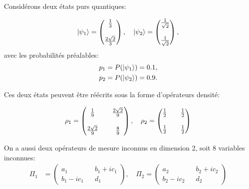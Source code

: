 Considérons deux états purs quantiques:

\begin{align}
    \ket{\psi_1} = \begin{pmatrix}\frac{1}{3} \\{\vrule height 1mm depth 1mm width 0mm}\\ \frac{2 \sqrt{2}}{3}\end{pmatrix} , \quad \ket{\psi_2} = \begin{pmatrix}\frac{1}{\sqrt{2}} \\ {\vrule height 1mm depth 1mm width 0mm} \\ \frac{1}{\sqrt{2}}\end{pmatrix},
\end{align}
avec les probabilités préalables:
\begin{align}
    p_1 &= P(\ket{\psi_1}) = 0.1, \\
    p_2 &= P(\ket{\psi_2}) = 0.9.
\end{align}

Ces deux états peuvent être réécrits sous la forme d'opérateurs densité:

\begin{align}
    \rho_1 = \begin{pmatrix}\frac{1}{9} && \frac{2 \sqrt{2}}{9} \\ {\vrule height 1mm depth 1mm width 0mm} \\ \frac{2 \sqrt{2}}{9} && \frac{8}{9} \end{pmatrix}, \quad \rho_2 = \begin{pmatrix}\frac{1}{2} && \frac{1}{2} \\ {\vrule height 1mm depth 1mm width 0mm} \\ \frac{1}{2} && \frac{1}{2} \end{pmatrix}
\end{align}


On a aussi deux opérateurs de mesure inconnus en dimension 2, soit 8 variables inconnues:
\begin{align}
    \Pi_1 &= \begin{pmatrix}a_1 && b_1 + ic_1 \\ b_1 - ic_1 && d_1\end{pmatrix}, \quad \Pi_2 = \begin{pmatrix}a_2 && b_2 + ic_2 \\ b_2 - ic_2 && d_2\end{pmatrix}
\end{align}

